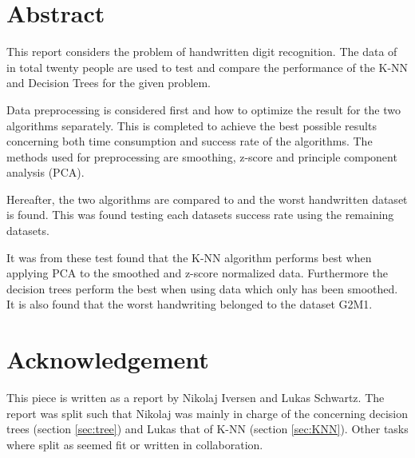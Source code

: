 \section*{Abstract}
This report considers the problem of handwritten digit recognition.
The data of in total twenty people are used to test and compare the performance of the K-NN and Decision Trees for the given problem.

Data preprocessing is considered first and how to optimize the result for the two algorithms separately.
This is completed to achieve the best possible results concerning both time consumption and success rate of the algorithms.
The methods used for preprocessing are smoothing, z-score and principle component analysis (PCA).

Hereafter, the two algorithms are compared to and the worst handwritten dataset is found.
This was found testing each datasets success rate using the remaining datasets.

It was from these test found that the K-NN algorithm performs best when applying PCA to the smoothed and z-score normalized data.
Furthermore the decision trees perform the best when using data which only has been smoothed.
It is also found that the worst handwriting belonged to the dataset G2M1.


\section*{Acknowledgement}
This piece is written as a report by Nikolaj Iversen and Lukas Schwartz.
The report was split such that Nikolaj was mainly in charge of the concerning decision trees (section \ref{sec:tree}) and Lukas that of K-NN (section \ref{sec:KNN}).
Other tasks where split as seemed fit or written in collaboration.